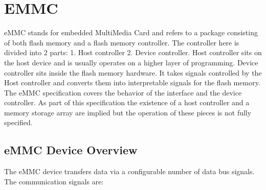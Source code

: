 \section{EMMC} eMMC stands for embedded MultiMedia Card and refers to a package consisting of both flash memory and a flash memory controller. The controller here is divided into 2 parts: 1. Host controller 2. Device controller. Host controller sits on the host device and is usually operates on a higher layer of programming. Device controller sits inside the flash memory hardware. It takes signals controlled by the Host controller and converts them into interpretable signals for the flash memory. The eMMC specification covers the behavior of the interface and the device controller. As part of this specification the existence of a host controller and a memory storage array are implied but the operation of these pieces is not fully specified.

\subsection{eMMC Device Overview}
The eMMC device transfers data via a configurable number of data bus signals. The communication signals are:

